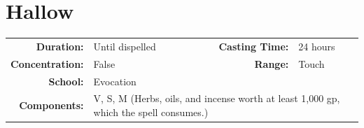 \documentclass[12pt]{memoir}
\begin{document}
\newpage
\section*{Hallow}

{
\small\centering\vspace{-6pt}
\begin{tabular}{rlrl}
\toprule

\textbf{Duration:} & Until dispelled &
\textbf{Casting Time:} & 24 hours \\
\textbf{Concentration:} & False &
\textbf{Range:} & Touch \\
\textbf{School:} & Evocation \\
\textbf{Components:} & \multicolumn{3}{p{0.7\textwidth}}{V, S, M (Herbs, oils, and incense worth at least 1,000 gp, which the spell consumes.)}\\

\bottomrule
\end{tabular}
}
\end{document}

